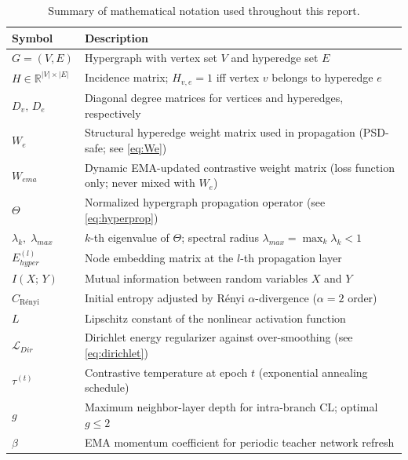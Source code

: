     \begin{table}[htbp]
    \centering
    \caption{Summary of mathematical notation used throughout this report.}
    \label{tab:notation}
    \renewcommand{\arraystretch}{1.35}
    \setlength{\tabcolsep}{9pt}
    \setlength{\arrayrulewidth}{0.45pt}
    \small
    \begin{tabularx}{\textwidth}{|l|L|}
    \hline
    \textbf{Symbol} & \textbf{Description} \\
    \hline
    $G = (V, E)$ & Hypergraph with vertex set $V$ and hyperedge set $E$ \\
    \hline
    $H \in \mathbb{R}^{|V|\times|E|}$ & Incidence matrix; $H_{v,e}=1$ iff vertex $v$ belongs to hyperedge $e$ \\
    \hline
    $D_v,\, D_e$ & Diagonal degree matrices for vertices and hyperedges, respectively \\
    \hline
    $W_e$ & Structural hyperedge weight matrix used in propagation (PSD-safe; see \cref{eq:We}) \\
    \hline
    $W_{ema}$ & Dynamic EMA-updated contrastive weight matrix (loss function only; never mixed with $W_e$) \\
    \hline
    $\Theta$ & Normalized hypergraph propagation operator (see \cref{eq:hyperprop}) \\
    \hline
    $\lambda_k,\;\lambda_{max}$ & $k$-th eigenvalue of $\Theta$; spectral radius $\lambda_{max} = \max_k \lambda_k < 1$ \\
    \hline
    $E_{hyper}^{(l)}$ & Node embedding matrix at the $l$-th propagation layer \\
    \hline
    $I(X;\,Y)$ & Mutual information between random variables $X$ and $Y$ \\
    \hline
    $C_{\text{R\'{e}nyi}}$ & Initial entropy adjusted by R\'{e}nyi $\alpha$-divergence ($\alpha{=}2$ order) \\
    \hline
    $L$ & Lipschitz constant of the nonlinear activation function \\
    \hline
    $\mathcal{L}_{Dir}$ & Dirichlet energy regularizer against over-smoothing (see \cref{eq:dirichlet}) \\
    \hline
    $\tau^{(t)}$ & Contrastive temperature at epoch $t$ (exponential annealing schedule) \\
    \hline
    $g$ & Maximum neighbor-layer depth for intra-branch CL; optimal $g \le 2$ \\
    \hline
    $\beta$ & EMA momentum coefficient for periodic teacher network refresh \\
    \hline
    \end{tabularx}
    \end{table}
    
